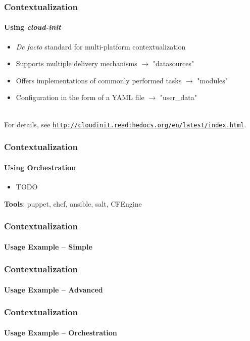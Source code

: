 \begin{frame}
  \frametitle{Contextualization}
  \framesubtitle{Using \textit{cloud-init}}

  \begin{itemize}
    \item \textit{De facto} standard for multi-platform contextualization
    \item Supports multiple delivery mechanisms $\rightarrow$ "datasources"
    \item Offers implementations of commonly performed tasks $\rightarrow$ "modules"
    \item Configuration in the form of a YAML file $\rightarrow$ "user\_data"
  \end{itemize}

  \hfill\\

  For details, see \href{http://cloudinit.readthedocs.org/en/latest/index.html}{\nolinkurl{http://cloudinit.readthedocs.org/en/latest/index.html}}.
\end{frame}

\begin{frame}
  \frametitle{Contextualization}
  \framesubtitle{Using Orchestration}

  \begin{itemize}
    \item TODO
  \end{itemize}

  \textbf{Tools}: puppet, chef, ansible, salt, CFEngine
\end{frame}

\begin{frame}
  \frametitle{Contextualization}
  \framesubtitle{Usage Example -- Simple}
\end{frame}

\begin{frame}
  \frametitle{Contextualization}
  \framesubtitle{Usage Example -- Advanced}
\end{frame}

\begin{frame}
  \frametitle{Contextualization}
  \framesubtitle{Usage Example -- Orchestration}
\end{frame}


